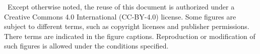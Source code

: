 \usepackage[type={CC}, modifier={by}, version={4.0}]{doclicense-di}

{%
  \copyrighttext%
  {\copyrightmetastring\ Except otherwise noted, the reuse of this
    document is authorized under a Creative Commons 4.0 International
  (CC-BY-4.0) license.}%
  {%
    \copyrightstring
    \doclicenseThis
    \blockpar
    Some figures are subject to different terms, such as copyright
    licenses and publisher permissions. There terms are indicated in
    the figure captions. Reproduction or modification of such figures
    is allowed under the conditions specified.
  }
}
